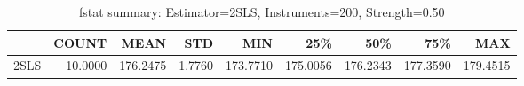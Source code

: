 \begin{table}[ht]
\centering
\caption{fstat summary: Estimator=2SLS, Instruments=200, Strength=0.50}
\begin{tabular}{lrrrrrrrr}
\toprule
 & COUNT & MEAN & STD & MIN & 25\% & 50\% & 75\% & MAX \\
\midrule
2SLS & 10.0000 & 176.2475 & 1.7760 & 173.7710 & 175.0056 & 176.2343 & 177.3590 & 179.4515 \\
\bottomrule
\end{tabular}
\end{table}
